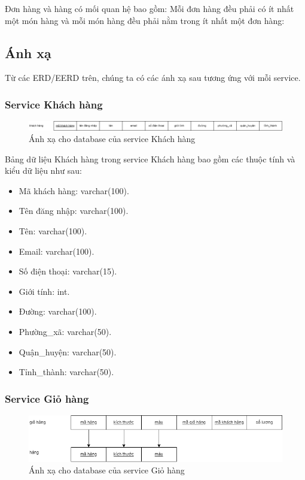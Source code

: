 Đơn hàng và hàng có mối quan hệ bao gồm: Mỗi đơn hàng đều phải có ít nhất một món hàng và mỗi món hàng đều phải nằm trong ít nhất một đơn hàng:


\subsection{Ánh xạ}
\par Từ các ERD/EERD trên, chúng ta có các ánh xạ sau tương ứng với mỗi service.

\subsubsection{Service Khách hàng}
\begin{figure}[!htp]
	\begin{center}
		\includegraphics[width=1\textwidth]{img/database/mapping/mapping-customer.png}
		\newline
		\caption{Ánh xạ cho database của service Khách hàng}
	\end{center}
\end{figure}

Bảng dữ liệu Khách hàng trong service Khách hàng bao gồm các thuộc tính và kiểu dữ liệu như sau:
\begin{itemize}
	\item Mã khách hàng: varchar(100).
	\item Tên đăng nhập: varchar(100).
	\item Tên: varchar(100).
	\item Email: varchar(100).
	\item Số điện thoại: varchar(15).
	\item Giới tính: int.
	\item Đường: varchar(100).
	\item Phường\_xã: varchar(50).
	\item Quận\_huyện: varchar(50).
	\item Tỉnh\_thành: varchar(50).
\end{itemize}

\subsubsection{Service Giỏ hàng}
\begin{figure}[!htp]
	\begin{center}
		\includegraphics[width=1\textwidth]{img/database/mapping/mapping-cart.png}
		\newline
		\caption{Ánh xạ cho database của service Giỏ hàng}
	\end{center}
\end{figure}

